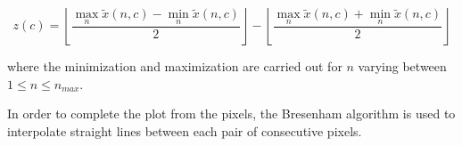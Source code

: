\begin{equation}
z(c) = \left \lfloor{ \frac{\max_{n} \tilde{x}(n,c)  - \min_{n} \tilde{x}(n,c) }{2} }\right \rfloor -   \left \lfloor{ \frac{\max_{n} \tilde{x}(n,c)  + \min_{n} \tilde{x}(n,c)}{ 2} }\right \rfloor
\label{eq:zerolevel}
\end{equation}

\noindent where the minimization and maximization are carried out for $n$ varying between ${1 \leq n\leq n_{max}}$.
  
In order to complete the plot from the pixels, the Bresenham \cite{Bresenham1965,Ramele2016} algorithm is used to interpolate straight lines between each pair of  consecutive pixels.

